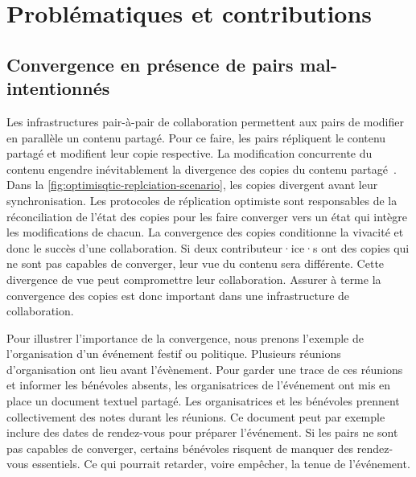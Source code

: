 \section{Problématiques et contributions}\label{sec:problematic}


\subsection{Convergence en présence de pairs mal-intentionnés}

Les infrastructures pair-à-pair de collaboration permettent aux pairs de modifier en parallèle un contenu partagé.
Pour ce faire, les pairs répliquent le contenu partagé et modifient leur copie respective.
La modification concurrente du contenu engendre inévitablement la divergence des copies du contenu partagé~\autocite{dourish_1995_divergence}.
Dans la \autoref{fig:optimisqtic-replciation-scenario}, les copies divergent avant leur synchronisation.
Les protocoles de réplication optimiste sont responsables de la réconciliation de l'état des copies pour les faire converger vers un état qui intègre les modifications de chacun.
La convergence des copies conditionne la vivacité et donc le succès d'une collaboration.
Si deux contributeur·ice·s ont des copies qui ne sont pas capables de converger, leur vue du contenu sera différente.
Cette divergence de vue peut compromettre leur collaboration.
Assurer à terme la convergence des copies est donc important dans une infrastructure de collaboration.

Pour illustrer l'importance de la convergence, nous prenons l'exemple de l'organisation d'un événement festif ou politique.
Plusieurs réunions d'organisation ont lieu avant l'évènement.
Pour garder une trace de ces réunions et informer les bénévoles absents, les organisatrices de l'événement ont mis en place un document textuel partagé.
Les organisatrices et les bénévoles prennent collectivement des notes durant les réunions.
Ce document peut par exemple inclure des dates de rendez-vous pour préparer l'événement.
Si les pairs ne sont pas capables de converger, certains bénévoles risquent de manquer des rendez-vous essentiels.
Ce qui pourrait retarder, voire empêcher, la tenue de l'événement.

